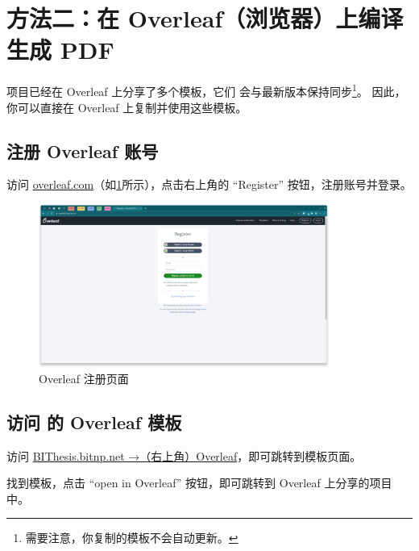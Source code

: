 \clearpage
\section{方法二：在 Overleaf（浏览器）上编译生成 PDF}
\label{sec:overleaf-compile}

\BIThesis 项目已经在 Overleaf 上分享了多个模板，它们
会与最新版本保持同步\footnote{需要注意，你复制的模板不会自动更新。}。
因此，你可以直接在 Overleaf 上复制并使用这些模板。

\vspace{\fill}
\subsection{注册 Overleaf 账号}

访问 \href{https://cn.overleaf.com}{overleaf.com}（如\cref{fig:overleaf-register}所示），点击右上角的 ``Register'' 按钮，注册账号并登录。

\begin{figure}[H]
  \begin{center}
    \includegraphics[width=0.85\textwidth]{imgs/overleaf-register.png}
  \end{center}
  \caption{Overleaf 注册页面}
  \label{fig:overleaf-register}
\end{figure}

\vspace{\fill}
\subsection{访问 \BIThesis 的 Overleaf 模板}

访问 \href{https://bithesis.bitnp.net/guide/preface.html#q-bithesis-都包含哪些模板}{BIThesis.bitnp.net →（右上角）Overleaf}，即可跳转到模板页面。

找到模板，点击 ``open in Overleaf'' 按钮，即可跳转到 Overleaf 上分享的项目中。

